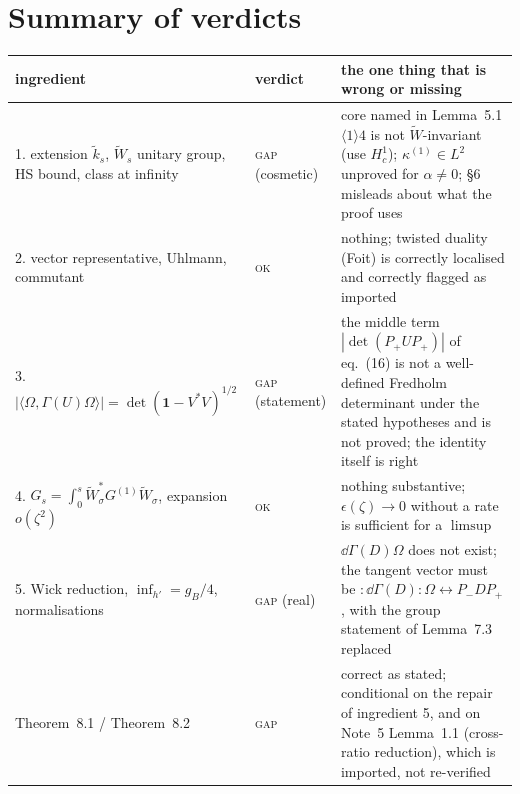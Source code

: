 \documentclass[11pt]{article}
\newcommand{\Wt}{\widetilde W}
\newcommand{\kt}{\widetilde k}
\newcommand{\Pp}{P_+}\newcommand{\Pm}{P_-}
\providecommand{\Om}{\Omega}\providecommand{\Gm}{\Gamma}\providecommand{\Qt}{\widetilde Q}
\providecommand{\ip}[2]{\langle #1,#2\rangle}\providecommand{\one}{\mathbf 1}
\begin{document}
\section{Summary of verdicts}\label{sec:summary}
\begin{center}\small
\begin{tabular}{p{}p{}p{}}
\toprule
ingredient & verdict & the one thing that is wrong or missing\\
\midrule
1. extension $\kt_s$, $\Wt_s$ unitary group, HS bound, class at infinity
 & \textsc{gap} (cosmetic)
 & core named in Lemma~5.1 $\langle1\rangle4$ is not $\Wt$-invariant (use $H^1_c$);
   $\kappa^{(1)}\in L^2$ unproved for $\alpha\ne0$; \S6 misleads about what the proof uses\\
2. vector representative, Uhlmann, commutant
 & \textsc{ok}
 & nothing; twisted duality (Foit) is correctly localised and correctly flagged as imported\\
3. $|\ip\Om{\Gm(U)\Om}|=\det(\one-V^*V)^{1/2}$
 & \textsc{gap} (statement)
 & the middle term $|\det(\Pp U\Pp)|$ of eq.~(16) is not a well-defined Fredholm determinant under
   the stated hypotheses and is not proved; the identity itself is right\\
4. $G_s=\int_0^s\Wt_\sigma^*G^{(1)}\Wt_\sigma$, expansion $o(\zeta^2)$
 & \textsc{ok}
 & nothing substantive; $\epsilon(\zeta)\to0$ without a rate is sufficient for a $\limsup$\\
5. Wick reduction, $\inf_{h'}=g_B/4$, normalisations
 & \textsc{gap} (real)
 & $\dd\Gm(D)\Om$ does not exist; the tangent vector must be $:\!\dd\Gm(D)\!:\Om
   \leftrightarrow\Pm D\Pp$, with the group statement of Lemma~7.3 replaced\\
\midrule
Theorem~8.1 / Theorem~8.2 & \textsc{gap} & correct as stated; conditional on the repair of
 ingredient 5, and on Note~5 Lemma~1.1 (cross-ratio reduction), which is imported, not re-verified\\
\bottomrule
\end{tabular}
\end{center}
\end{document}
